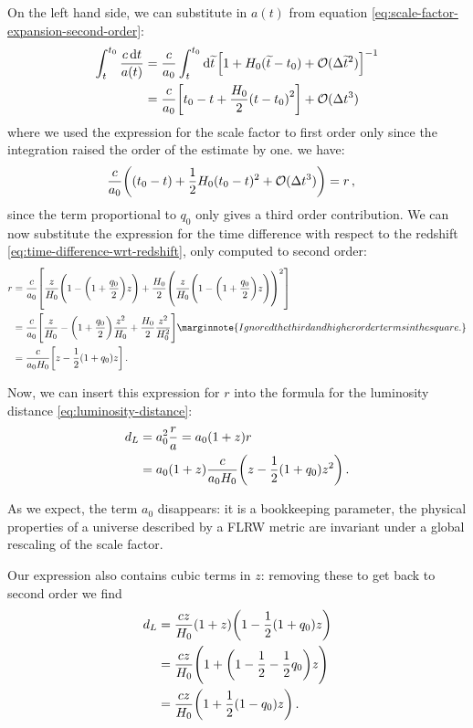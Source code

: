 \documentclass[main.tex]{subfiles}
\begin{document}
On the left hand side, we can substitute in \(a(t)\) from equation \eqref{eq:scale-factor-expansion-second-order}:
\begin{align}
\int_{t}^{t_0} \frac{c\dd{t}}{a(t)} 
&= \frac{c}{a_0 }
\int_{t }^{t_0 } \dd{\widetilde{t}} \qty[1 + H_0 (\widetilde{t} - t_0) + \mathcal{O}(\Delta \widetilde{t}^2)]^{-1}  \\
&= \frac{c}{a_0 } \qty[t_0  - t + \frac{H_0}{2} \qty(t-t_0 )^2] + \mathcal{O}(\Delta t^3)
\end{align}
%
where we used the expression for the scale factor to first order only since the integration raised the order of the estimate by one.
we have:
\begin{align}
\frac{c}{a_0 } \qty((t_0 - t) + \frac{1}{2} H_0 (t_0 - t)^2 + \mathcal{O}(\Delta t ^3)) &= r  
\,,
\end{align}
%
since the term proportional to \(q_0 \) only gives a third order contribution.
We can now substitute the expression for the time difference with respect to the redshift \eqref{eq:time-difference-wrt-redshift}, only computed to second order: 
%
\begin{align}
r &= \frac{c}{a_0 } \qty[\frac{z}{H_0 } \qty(1 -\qty(1 + \frac{q_0}{2})z)+ \frac{H_0 }{2} \qty(\frac{z}{H_0 } \qty(1 -\qty(1 + \frac{q_0}{2})z))^2]  \\
&= \frac{c}{a_0 } \qty[\frac{z}{H_0 } - \qty(1+\frac{q_0}{2})\frac{z^2}{H_0 } + \frac{H_0}{2} \frac{z^2}{H_0^2}] \marginnote{Ignored the third and higher order terms in the square.}  \\
&= \frac{c}{a_0 H_0 } \qty[z - \frac{1}{2} \qty(1 + q_0 )z]
\,.
\end{align}
%

Now, we can insert this expression for \(r\) into the formula for the luminosity distance \eqref{eq:luminosity-distance}:
\begin{align}
d_L &= a_0^2 \frac{r}{a} = a_0 (1+z) r \\
&= a_0 (1+z) \frac{c}{a_0 H_0 } \qty(z - \frac{1}{2} (1+ q_0 )z^2)
\,.
\end{align}

As we expect, the term \(a_0 \) disappears: it is a bookkeeping parameter, the physical properties of a universe described by a FLRW metric are invariant under a global rescaling of the scale factor.

Our expression also contains cubic terms in \(z\): removing these to get back to second order we find
\begin{align}
d_L &= \frac{cz}{H_0} 
\qty(1+z) \qty(1- \frac{1}{2}\qty(1+q_0)z)  \\
&= \frac{cz}{H_0 } \qty(1 + \qty( 1 - \frac{1}{2} - \frac{1}{2}q_0 )z)  \\
&= \frac{cz}{H_0 } \qty(1 + \frac{1}{2}\qty(1 - q_0) z)
\,.
\end{align}
\end{document}
